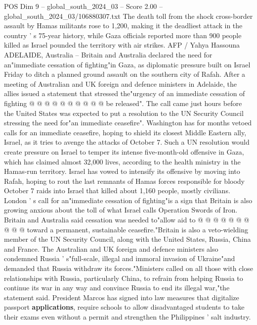 \begin{textsample}{POS Dim 9 – global\_south\_2024\_03 – Score 2.00 – global\_south\_2024\_03/106880307.txt}
The death toll from the shock cross-border assault by Hamas militants rose to 1,200, making it the deadliest attack in the country ' s 75-year history, while Gaza officials reported more than 900 people killed as Israel pounded the territory with air strikes.
AFP / Yahya Hassouna ADELAIDE, Australia -- Britain and Australia declared the need for an"immediate cessation of fighting"in Gaza, as diplomatic pressure built on Israel Friday to ditch a planned ground assault on the southern city of Rafah.
After a meeting of Australian and UK foreign and defence ministers in Adelaide, the allies issued a statement that stressed the"urgency of an immediate cessation of fighting @ @ @ @ @ @ @ @ @ @ be released".
The call came just hours before the United States was expected to put a resolution to the UN Security Council stressing the need for"an immediate ceasefire".
Washington has for months vetoed calls for an immediate ceasefire, hoping to shield its closest Middle Eastern ally, Israel, as it tries to avenge the attacks of October 7.
Such a UN resolution would create pressure on Israel to temper its intense five-month-old offensive in Gaza, which has claimed almost 32,000 lives, according to the health ministry in the Hamas-run territory.
Israel has vowed to intensify its offensive by moving into Rafah, hoping to rout the last remnants of Hamas forces responsible for bloody October 7 raids into Israel that killed about 1,160 people, mostly civilians.
London ' s call for an"immediate cessation of fighting"is a sign that Britain is also growing anxious about the toll of what Israel calls Operation Swords of Iron.
Britain and Australia said cessation was needed to"allow aid to @ @ @ @ @ @ @ @ @ @ toward a permanent, sustainable ceasefire."Britain is also a veto-wielding member of the UN Security Council, along with the United States, Russia, China and France.
The Australian and UK foreign and defence ministers also condemned Russia ' s"full-scale, illegal and immoral invasion of Ukraine"and demanded that Russia withdraw its forces."Ministers called on all those with close relationships with Russia, particularly China, to refrain from helping Russia to continue its war in any way and convince Russia to end its illegal war,"the statement said.
President Marcos has signed into law measures that digitalize passport \textbf{applications}, require schools to allow disadvantaged students to take their exams even without a permit and strengthen the Philippines ' salt industry.

\end{textsample}
